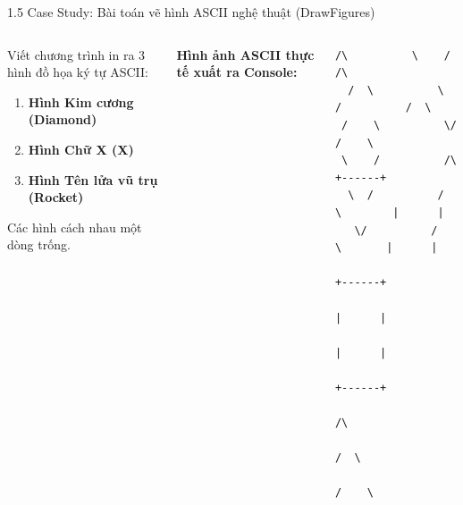 \documentclass[aspectratio=169, 10pt]{beamer}
\begin{document}
\begin{frame}[fragile]{1.5 Case Study: Bài toán vẽ hình ASCII nghệ thuật (DrawFigures)}
  \begin{columns}
    \begin{tcolorbox}[colback=white,colframe=UniNavy,title=\textbf{Yêu cầu bài toán (Output mong đợi)}]
      Viết chương trình in ra 3 hình đồ họa ký tự ASCII:
      \begin{enumerate}
        \item \textbf{Hình Kim cương (Diamond)}
        \item \textbf{Hình Chữ X (X)}
        \item \textbf{Hình Tên lửa vũ trụ (Rocket)}
      \end{enumerate}
      Các hình cách nhau một dòng trống.
    \end{tcolorbox}

    \textbf{Hình ảnh ASCII thực tế xuất ra Console:}
    \begin{lstlisting}[style=terminalStyle]
   /\          \    /          /\ 
  /  \          \  /          /  \ 
 /    \          \/          /    \ 
 \    /          /\         +------+
  \  /          /  \        |      |
   \/          /    \       |      |
                            +------+
                            |      |
                            |      |
                            +------+
                               /\ 
                              /  \ 
                             /    \ 
    \end{lstlisting}
  \end{columns}
\end{frame}
\end{document}
